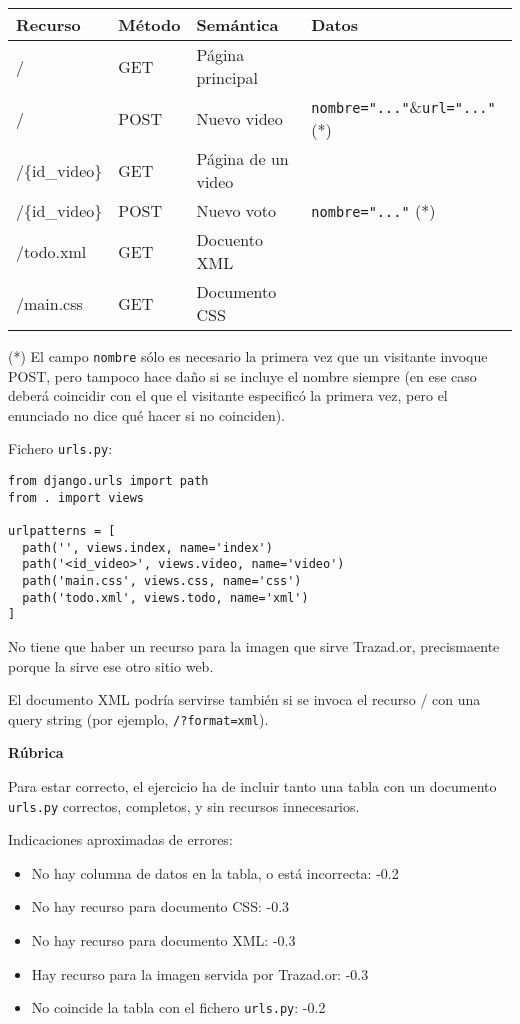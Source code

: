 \begin{tabular}{|l|l|l|l|}
  \hline
  Recurso & Método & Semántica & Datos \\ \hline\hline
  /       & GET    & Página principal & \\
  /       & POST   & Nuevo video & \texttt{nombre="..."}\&\texttt{url="..."} (*) \\
  /\{id\_video\} & GET & Página de un video & \\
  /\{id\_video\} & POST & Nuevo voto & \texttt{nombre="..."} (*) \\
  /todo.xml & GET & Docuento XML & \\
  /main.css & GET & Documento CSS &  \\
  \hline
\end{tabular}

(*) El campo \texttt{nombre} sólo es necesario la primera vez que un visitante invoque POST, pero tampoco hace daño si se incluye el nombre siempre (en ese caso deberá coincidir con el que el visitante especificó la primera vez, pero el enunciado no dice qué hacer si no coinciden).

\vspace{.4cm}
Fichero \texttt{urls.py}:

\begin{verbatim}
from django.urls import path
from . import views

urlpatterns = [
  path('', views.index, name='index')
  path('<id_video>', views.video, name='video')
  path('main.css', views.css, name='css')
  path('todo.xml', views.todo, name='xml')
]
\end{verbatim}

No tiene que haber un recurso para la imagen que sirve Trazad.or, precismaente porque la sirve ese otro sitio web.

El documento XML podría servirse también si se invoca el recurso / con una query string (por ejemplo, \texttt{/?format=xml}).

\vspace{.4cm}\textbf{Rúbrica}

Para estar correcto, el ejercicio ha de incluir tanto una tabla con un documento \texttt{urls.py} correctos, completos, y sin recursos innecesarios.

Indicaciones aproximadas de errores:

\begin{itemize}
\item No hay columna de datos en la tabla, o está incorrecta: -0.2
\item No hay recurso para documento CSS: -0.3
\item No hay recurso para documento XML: -0.3
\item Hay recurso para la imagen servida por Trazad.or: -0.3
\item No coincide la tabla con el fichero \texttt{urls.py}: -0.2
\end{itemize}

